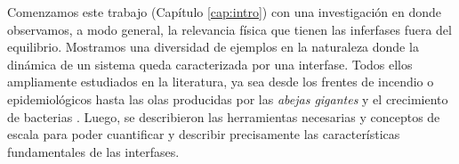 \graphicspath{{figs/cap6}}


Comenzamos este trabajo (Capítulo \ref{cap:intro}) con una investigación en donde observamos, a modo general, la relevancia física que tienen las inferfases fuera del equilibrio. Mostramos una diversidad de ejemplos en la naturaleza donde la dinámica de un sistema queda caracterizada por una interfase. Todos ellos ampliamente estudiados en la literatura, ya sea desde los frentes de incendio o epidemiológicos hasta las olas producidas por las \textit{abejas gigantes} y el crecimiento de bacterias \cite{zhang1992modeling, provatas1995scaling, PhysRevLett.79.1515, Jullien1992SurfaceD, PhysRevLett.110.035501, kastberger2014speeding, kastberger2013social, kastberger2008social, matsushita1990diffusion, bhattacharjee2022chemotactic, mate_sist_bio, barbieri2020soil, stenseth2008plague}. Luego, se describieron las herramientas necesarias y conceptos de escala para poder cuantificar y describir precisamente las características fundamentales de las interfases.








